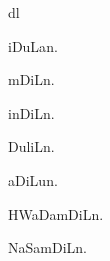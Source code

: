 \begin{multicols*}{2}
\begin{dictroot}{d}{l}
\begin{dictentry}{iDuLa}{n.}
{        }
    \end{dictentry}
    \begin{dictentry}{mDiL}{n.}
    \end{dictentry}
    \begin{dictentry}{inDiL}{n.}
    \end{dictentry}
    \begin{dictentry}{DuliL}{n.}
    \end{dictentry}



    \begin{dictentry}{aDiLu}{n.}
    \end{dictentry}




    \begin{dictentry}{HWaDamDiL}{n.}
    \end{dictentry}
    \begin{dictentry}{NaSamDiL}{n.}
    \end{dictentry}
\end{dictroot}


\end{multicols*}

